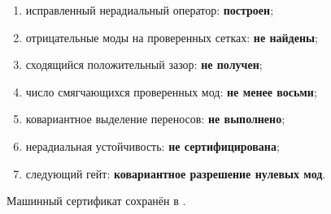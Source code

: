 \begin{protocol}
\begin{enumerate}
 \item исправленный нерадиальный оператор: \textbf{построен};
 \item отрицательные моды на проверенных сетках: \textbf{не найдены};
 \item сходящийся положительный зазор: \textbf{не получен};
 \item число смягчающихся проверенных мод: \textbf{не менее восьми};
 \item ковариантное выделение переносов: \textbf{не выполнено};
 \item нерадиальная устойчивость: \textbf{не сертифицирована};
 \item следующий гейт: \textbf{ковариантное разрешение нулевых мод}.
\end{enumerate}
\end{protocol}

Машинный сертификат сохранён в
.